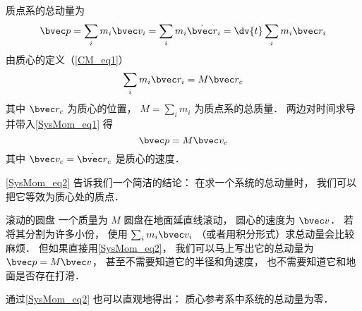

质点系的总动量为
\begin{equation}\label{SysMom_eq1}
\bvec p = \sum_i m_i \bvec v_i = \sum_i m_i \dot{\bvec r}_i = \dv{t}  \sum_i m_i \bvec r_i
\end{equation}
由质心的定义（\autoref{CM_eq1}） 
\begin{equation}
\sum_i m_i \bvec r_i = M \bvec r_c
\end{equation}
其中 $\bvec r_c$ 为质心的位置， $M = \sum_i m_i$ 为质点系的总质量． 两边对时间求导并带入\autoref{SysMom_eq1} 得
\begin{equation}\label{SysMom_eq2}
\bvec p = M\bvec v_c
\end{equation}
其中 $\bvec v_c = \dot{\bvec r}_c$ 是质心的速度．

\autoref{SysMom_eq2} 告诉我们一个简洁的结论： 在求一个系统的总动量时， 我们可以把它等效为质心处的质点．

\begin{example}{滚动的圆盘}
一个质量为 $M$ 圆盘在地面延直线滚动， 圆心的速度为 $\bvec v$． 若将其分割为许多小份， 使用 $\sum_i m_i \bvec v_i$ （或者用积分形式）求总动量会比较麻烦． 但如果直接用\autoref{SysMom_eq2}， 我们可以马上写出它的总动量为 $\bvec p = M\bvec v$， 甚至不需要知道它的半径和角速度， 也不需要知道它和地面是否存在打滑．
\end{example}

通过\autoref{SysMom_eq2} 也可以直观地得出： 质心参考系中系统的总动量为零．
